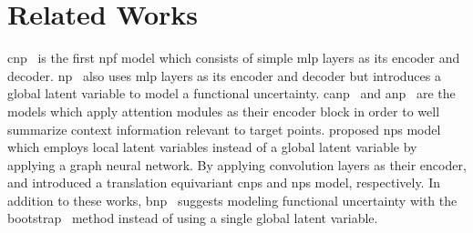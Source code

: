 \section{Related Works}
\label{main:sec:related}
\gls{cnp}~\citep{garnelo2018conditional} is the first \gls{npf} model which consists of simple \gls{mlp} layers as its encoder and decoder. \gls{np}~\citep{garnelo2018neural} also uses \gls{mlp} layers as its encoder and decoder but introduces a global latent variable to model a functional uncertainty.
\gls{canp}~\citep{kim2018attentive} and \gls{anp}~\citep{kim2018attentive} are the models which apply attention modules as their encoder block in order to well summarize context information relevant to target points. 
\citet{louizos2019functional} proposed \glspl{np} model which employs local latent variables instead of a global latent variable by applying a graph neural network.
By applying convolution layers as their encoder, \citet{gordon2020convolutional} and \citet{foong2020meta} introduced a translation equivariant \glspl{cnp} and \glspl{np} model, respectively. 
In addition to these works, \gls{bnp}~\citep{lee2020bootstrapping} suggests modeling functional uncertainty with the bootstrap~\citep{efron1992bootstrap} method instead of using a single global latent variable. 
